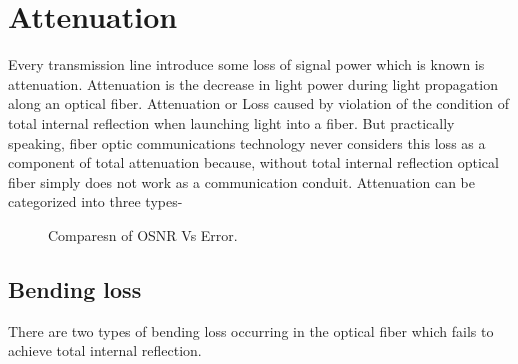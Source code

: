 \documentclass[12pt]{report}
\begin{document}
	
	\section{Attenuation}
	Every transmission line introduce some loss of signal power which is known is attenuation. Attenuation is the decrease in light power during light propagation along an optical fiber. Attenuation or Loss caused by violation of the condition of total internal reflection when launching light into a fiber. But practically speaking, fiber optic communications technology never considers this loss as a component of total attenuation because, without total internal reflection optical fiber simply does not work as a communication conduit. Attenuation can be categorized into three types- 
	\begin{figure}[htbp]
		\caption{Comparesn of OSNR Vs Error.}
		\label{fig1}
	\end{figure}
	\subsection{Bending loss}
	There are two types of bending loss occurring in the optical fiber which fails to achieve total internal reflection. 
\end{document}
